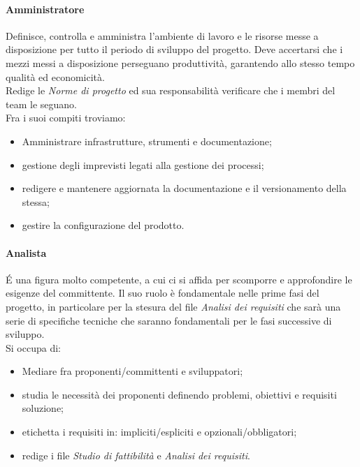         \paragraph{Amministratore}
            Definisce, controlla e amministra l'ambiente di lavoro e le risorse messe a disposizione per tutto il periodo di sviluppo del progetto.
            Deve accertarsi che i mezzi messi a disposizione perseguano produttività, garantendo allo stesso tempo qualità ed economicità. \\
            Redige le \emph{Norme di progetto} ed sua responsabilità verificare che i membri del team le seguano. \\
            Fra i suoi compiti troviamo:
            \begin{itemize}
                \item Amministrare infrastrutture, strumenti e documentazione;
                \item gestione degli imprevisti legati alla gestione dei processi;
                \item redigere e mantenere aggiornata la documentazione e il versionamento della stessa;
                \item gestire la configurazione del prodotto.
            \end{itemize}
        \paragraph{Analista}
            \'E una figura molto competente, a cui ci si affida per scomporre e approfondire le esigenze del committente. Il suo ruolo è fondamentale nelle prime fasi del progetto, in particolare per la stesura del file \emph{Analisi dei requisiti} che sarà una serie di specifiche tecniche che saranno fondamentali per le fasi successive di sviluppo. \\
            Si occupa di:
            \begin{itemize}
                \item Mediare fra proponenti/committenti e sviluppatori;
                \item studia le necessità dei proponenti definendo problemi, obiettivi e requisiti soluzione;
                \item etichetta i requisiti in: impliciti/espliciti e opzionali/obbligatori;
                \item redige i file \emph{Studio di fattibilità} e \emph{Analisi dei requisiti}.
            \end{itemize}
